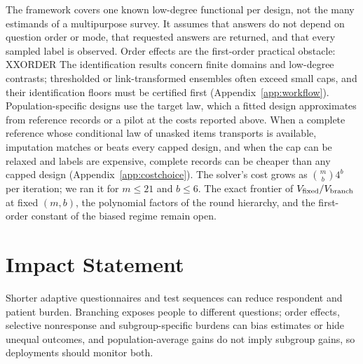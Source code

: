 \documentclass{article}
\begin{document}
The framework covers one known low-degree functional per design, not the many estimands of a multipurpose survey. It assumes that answers do not depend on question order or mode, that requested answers are returned, and that every sampled label is observed. Order effects are the first-order practical obstacle: XXORDER The identification results concern finite domains and low-degree contrasts; thresholded or link-transformed ensembles often exceed small caps, and their identification floors must be certified first (Appendix~\ref{app:workflow}). Population-specific designs use the target law, which a fitted design approximates from reference records or a pilot at the costs reported above. When a complete reference whose conditional law of unasked items transports is available, imputation matches or beats every capped design, and when the cap can be relaxed and labels are expensive, complete records can be cheaper than any capped design (Appendix~\ref{app:costchoice}). The solver's cost grows as $\binom mb4^b$ per iteration; we ran it for $m\le21$ and $b\le6$. The exact frontier of $V_{\rm fixed}/V_{\rm branch}$ at fixed $(m,b)$, the polynomial factors of the round hierarchy, and the first-order constant of the biased regime remain open.

\section*{Impact Statement}
Shorter adaptive questionnaires and test sequences can reduce respondent and patient burden. Branching exposes people to different questions; order effects, selective nonresponse and subgroup-specific burdens can bias estimates or hide unequal outcomes, and population-average gains do not imply subgroup gains, so deployments should monitor both.



\clearpage
\onecolumn
\raggedbottom
\appendix
{}

\end{document}
